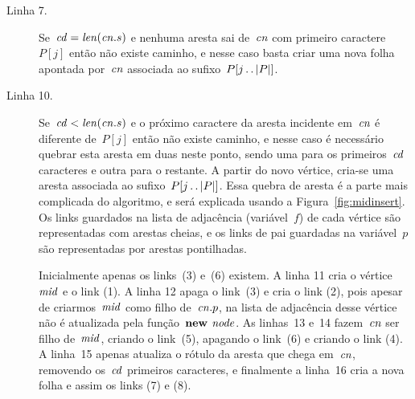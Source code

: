 \begin{description}
    \item[Linha 7.] Se~$\mathit{cd} = \mathit{len}(\mathit{cn}.s)$ e nenhuma aresta sai de~$\mathit{cn}$ com primeiro caractere~$P[j]$ então não existe caminho, e nesse caso basta criar uma nova folha apontada por~$\mathit{cn}$ associada ao sufixo~$P[j\,.\,.\, |P|]$.
    
    \item[Linha 10.] Se~$\mathit{cd} < \mathit{len}(\mathit{cn}.s)$ e o próximo caractere da aresta incidente em~$\mathit{cn}$ é diferente de~$P[j]$ então não existe caminho, e nesse caso é necessário quebrar esta aresta em duas neste ponto, sendo uma para os primeiros~$\mathit{cd}$ caracteres e outra para o restante. A partir do novo vértice, cria-se uma aresta associada ao sufixo~$P[j\,.\,.\, |P|]$. Essa quebra de aresta é a parte mais complicada do algoritmo, e será explicada usando a Figura~\ref{fig:midinsert}. Os links guardados na lista de adjacência (variável~$f$) de cada vértice são representadas com arestas cheias, e os links de pai guardadas na variável~$p$ são representadas por arestas pontilhadas.
    
    Inicialmente apenas os links~(3) e~(6) existem. A linha 11 cria o vértice~$\mathit{mid}$ e o link (1). A linha 12 apaga o link~(3) e cria o link (2), pois apesar de criarmos~$\mathit{mid}$ como filho de~$\mathit{cn}.p$, na lista de adjacência desse vértice não é atualizada pela função~$\textbf{new } \mathit{node}$. As linhas~13 e~14 fazem~$\mathit{cn}$ ser filho de~$\mathit{mid}$, criando o link~(5), apagando o link~(6) e criando o link (4). A linha~15 apenas atualiza o rótulo da aresta que chega em~$\mathit{cn}$, removendo os~$\mathit{cd}$ primeiros caracteres, e finalmente a linha~16 cria a nova folha e assim os links (7) e (8).
\end{description}

